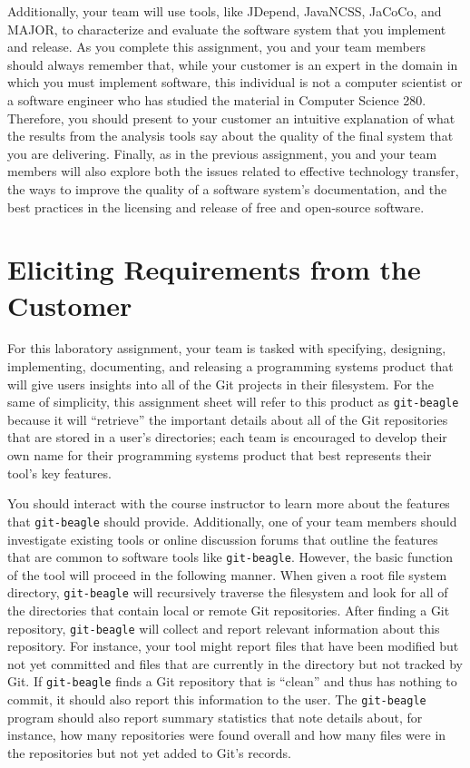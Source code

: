 Additionally, your team will use tools, like JDepend, JavaNCSS, JaCoCo, and MAJOR, to characterize and evaluate the
software system that you implement and release.  As you complete this assignment, you and your team members should
always remember that, while your customer is an expert in the domain in which you must implement software, this
individual is not a computer scientist or a software engineer who has studied the material in Computer Science 280.
Therefore, you should present to your customer an intuitive explanation of what the results from the analysis tools say
about the quality of the final system that you are delivering.  Finally, as in the previous assignment, you and your
team members will also explore both the issues related to effective technology transfer, the ways to improve the quality
of a software system's documentation, and the best practices in the licensing and release of free and open-source
software.

\section*{Eliciting Requirements from the Customer}

For this laboratory assignment, your team is tasked with specifying, designing, implementing, documenting, and releasing
a programming systems product that will give users insights into all of the Git projects in their filesystem. For the
same of simplicity, this assignment sheet will refer to this product as {\tt git-beagle} because it will ``retrieve''
the important details about all of the Git repositories that are stored in a user's directories; each team is encouraged
to develop their own name for their programming systems product that best represents their tool's key features.

You should interact with the course instructor to learn more about the features that {\tt git-beagle} should provide.
Additionally, one of your team members should investigate existing tools or online discussion forums that outline the
features that are common to software tools like {\tt git-beagle}. However, the basic function of the tool will proceed
in the following manner. When given a root file system directory, {\tt git-beagle} will recursively traverse the
filesystem and look for all of the directories that contain local or remote Git repositories. After finding a Git
repository, {\tt git-beagle} will collect and report relevant information about this repository. For instance, your tool
might report files that have been modified but not yet committed and files that are currently in the directory but
not tracked by Git. If {\tt git-beagle} finds a Git repository that is ``clean'' and thus has nothing to commit, it
should also report this information to the user. The {\tt git-beagle} program should also report summary statistics that
note details about, for instance, how many repositories were found overall and how many files were in the repositories
but not yet added to Git's records.

